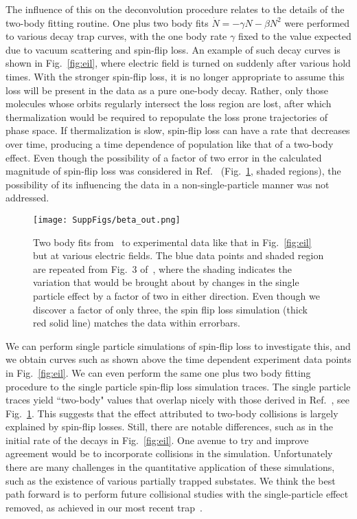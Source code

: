\documentclass[%
 reprint,
 amsmath,amssymb,
 aps,
pra,
]{revtex4-1}
\begin{document}
The influence of this on the deconvolution procedure relates to the details of the two-body fitting routine.
One plus two body fits $\dot{N}=-\gamma N-\beta N^2$ were performed to various decay trap curves, with the one body rate $\gamma$ fixed to the value expected due to vacuum scattering and spin-flip loss.
An example of such decay curves is shown in Fig.~\ref{fig:eil}, where electric field is turned on suddenly after various hold times.
With the stronger spin-flip loss, it is no longer appropriate to assume this loss will be present in the data as a pure one-body decay.
Rather, only those molecules whose orbits regularly intersect the loss region are lost, after which thermalization would be required to repopulate the loss prone trajectories of phase space.
If thermalization is slow, spin-flip loss can have a rate that decreases over time, producing a time dependence of population like that of a two-body effect.
Even though the possibility of a factor of two error in the calculated magnitude of spin-flip loss was considered in Ref.~\cite{Stuhl2013} (Fig.~\ref{fig:beta}, shaded regions), the possibility of its influencing the data in a non-single-particle manner was not addressed.

\begin{figure}[t] 
\texttt{[image: SuppFigs/beta\_out.png]} 
\caption{Two body fits from~\cite{Stuhl2013} to experimental data like that in Fig.~\ref{fig:eil} but at various electric fields. The blue data points and shaded region are repeated from Fig.~3 of~\cite{Stuhl2013}, where the shading indicates the variation that would be brought about by changes in the single particle effect by a factor of two in either direction. Even though we discover a factor of only three, the spin flip loss simulation (thick red solid line) matches the data within errorbars.\label{fig:beta}}
\end{figure}


We can perform single particle simulations of spin-flip loss to investigate this, and we obtain curves such as shown above the time dependent experiment data points in Fig.~\ref{fig:eil}.
We can even perform the same one plus two body fitting procedure to the single particle spin-flip loss simulation traces.
The single particle traces yield ``two-body" values that overlap nicely with those derived in Ref.~\cite{Stuhl2013}, see Fig.~\ref{fig:beta}.
This suggests that the effect attributed to two-body collisions is largely explained by spin-flip losses.
Still, there are notable differences, such as in the initial rate of the decays in Fig.~\ref{fig:eil}.
One avenue to try and improve agreement would be to incorporate collisions in the simulation.
Unfortunately there are many challenges in the quantitative application of these simulations, such as the existence of various partially trapped substates.
We think the best path forward is to perform future collisional studies with the single-particle effect removed, as achieved in our most recent trap~\cite{smt}.
\end{document}

